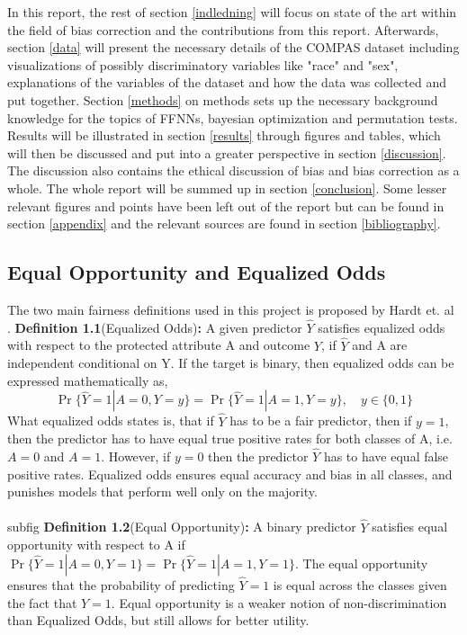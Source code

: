 \documentclass[11pt, fleqn, titlepage]{article}
\begin{document}
	\noindent In this report, the rest of section \ref{indledning} will focus on state of the art within the field of bias correction and the contributions from this report. Afterwards, section \ref{data} will present the necessary details of the COMPAS dataset including visualizations of possibly discriminatory variables like "race" and "sex", explanations of the variables of the dataset and how the data was collected and put together. Section \ref{methods} on methods sets up the necessary background knowledge for the topics of FFNNs, bayesian optimization and permutation tests. Results will be illustrated in section \ref{results} through figures and tables, which will then be discussed and put into a greater perspective in section \ref{discussion}. The discussion also contains the ethical discussion of bias and bias correction as a whole. The whole report will be summed up in section \ref{conclusion}. Some lesser relevant figures and points have been left out of the report but can be found in section \ref{appendix} and the relevant sources are found in section \ref{bibliography}.
	
	\subsection{Equal Opportunity and Equalized Odds}\label{bias_def}
	
	The two main fairness definitions used in this project is proposed by Hardt et. al \cite{equal_of_oppor}. \textbf{Definition 1.1}(Equalized Odds)\textbf{:} A given predictor $ \hat Y $ satisfies equalized odds with respect to the protected attribute A and outcome $ Y $, if $ \hat Y $ and A are independent conditional on Y. If the target is binary, then equalized odds can be expressed mathematically as,
	\begin{equation*}\label{key}
	\operatorname{Pr}\{\widehat{Y}=1 | A=0, Y=y\}=\operatorname{Pr}\{\hat{Y}=1 | A=1, Y=y\}, \quad y \in\{0,1\}
	\end{equation*}
	What equalized odds states is, that if $ \hat Y $ has to be a fair predictor, then if $ y = 1 $, then the predictor has to have equal true positive rates for both classes of A, i.e. $ A = 0 $  and $ A = 1 $. However, if $ y = 0 $ then the predictor $ \hat Y $ has to have equal false positive rates. Equalized odds ensures equal accuracy and bias in all classes, and punishes models that perform well only on the majority.
	\\\\subfig
	\textbf{Definition 1.2}(Equal Opportunity)\textbf{:} A binary predictor $ \hat Y $ satisfies equal opportunity with respect to A if $ \operatorname{Pr}\{\hat{Y}=1 | A=0, Y=1\}=\operatorname{Pr}\{\hat{Y}=1 | A=1, Y=1\} $. The equal opportunity ensures that the probability of predicting $ \hat Y = 1 $ is equal across the classes given the fact that $ Y = 1 $. Equal opportunity is a weaker notion of non-discrimination than Equalized Odds, but still allows for better utility.
	
\end{document}
